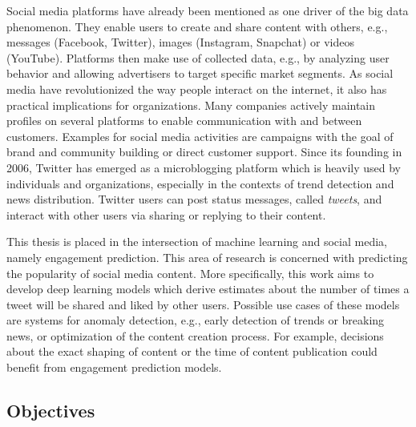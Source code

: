 Social media platforms have already been mentioned as one driver of the big
data phenomenon.
They enable users to create and share content with others, e.g., messages
(Facebook, Twitter), images (Instagram, Snapchat) or videos (YouTube).
Platforms then make use of collected data, e.g., by analyzing user behavior and
allowing advertisers to target specific market segments.
As social media have revolutionized the way people interact on the internet,
it also has practical implications for organizations.
Many companies actively maintain profiles on several platforms to enable
communication with and between customers.
Examples for social media activities are campaigns with the goal of brand
and community building or direct customer support.
Since its founding in 2006, Twitter has emerged as a microblogging platform
which is heavily used by individuals and organizations, especially in the
contexts of trend detection and news distribution.
Twitter users can post status messages, called \textit{tweets}, and interact
with other users via sharing or replying to their content.

This thesis is placed in the intersection of machine learning and social media,
namely engagement prediction.
This area of research is concerned with predicting the popularity of social
media content.
More specifically, this work aims to develop deep learning models which derive
estimates about the number of times a tweet will be shared and liked by other users.
Possible use cases of these models are systems for anomaly detection, e.g.,
early detection of trends or breaking news, or optimization of the content
creation process.
For example, decisions about the exact shaping of content or the time of
content publication could benefit from engagement prediction models.

\subsection{Objectives}
\label{sec:objectives}

